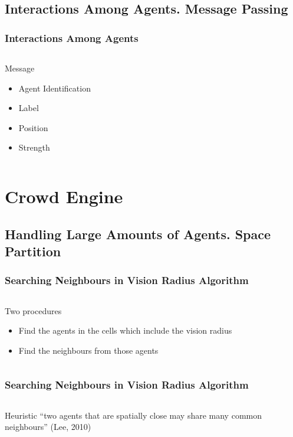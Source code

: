 \documentclass{beamer}
\begin{document}
\subsection{Interactions Among Agents. Message Passing}

\begin{frame}
\frametitle{Interactions Among Agents}
\begin{center}
\begin{columns}
	\column{4cm}
	\begin{block}{Message}
	\begin{itemize}
	\item Agent Identification
	\item Label
	\item Position
	\item Strength
	\end{itemize}
	\end{block}
	\column{3cm}
\end{columns}
\end{center}
\end{frame}

\section{Crowd Engine}

\subsection{Handling Large Amounts of Agents. Space Partition}

\begin{frame}
\frametitle{Searching Neighbours in Vision Radius Algorithm}
\begin{center}
\begin{columns}
	\column{4cm}
	\column{4cm}
	\begin{block}{Two procedures}
	\begin{itemize}
	\item Find the agents in the cells which
	include the vision radius
	\item Find the neighbours from those agents
	\end{itemize}
	\end{block}
\end{columns}
\end{center}
\end{frame}

\begin{frame}
\frametitle{Searching Neighbours in Vision Radius Algorithm}
\begin{center}
\begin{columns}
	\column{4cm}
	\column{4cm}
	\begin{block}{Heuristic}
	``two agents that are spatially close 
	 may share many common neighbours'' (Lee, 2010)
	\end{block}
\end{columns}
\end{center}
\end{frame}
\end{document}
